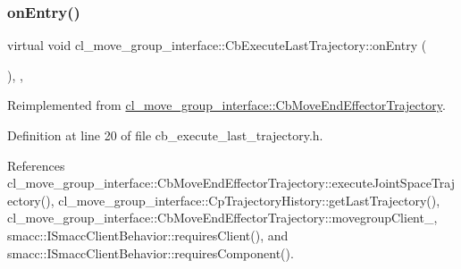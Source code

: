 \subsubsection{\texorpdfstring{on\+Entry()}{onEntry()}}
{\footnotesize\ttfamily virtual void cl\+\_\+move\+\_\+group\+\_\+interface\+::\+Cb\+Execute\+Last\+Trajectory\+::on\+Entry (\begin{DoxyParamCaption}{ }\end{DoxyParamCaption})\hspace{0.3cm}{\ttfamily [inline]}, {\ttfamily [override]}, {\ttfamily [virtual]}}



Reimplemented from \hyperlink{classcl__move__group__interface_1_1CbMoveEndEffectorTrajectory_aaedd074fd178c6390a4a3f1ccff23ad3}{cl\+\_\+move\+\_\+group\+\_\+interface\+::\+Cb\+Move\+End\+Effector\+Trajectory}.



Definition at line 20 of file cb\+\_\+execute\+\_\+last\+\_\+trajectory.\+h.



References cl\+\_\+move\+\_\+group\+\_\+interface\+::\+Cb\+Move\+End\+Effector\+Trajectory\+::execute\+Joint\+Space\+Trajectory(), cl\+\_\+move\+\_\+group\+\_\+interface\+::\+Cp\+Trajectory\+History\+::get\+Last\+Trajectory(), cl\+\_\+move\+\_\+group\+\_\+interface\+::\+Cb\+Move\+End\+Effector\+Trajectory\+::movegroup\+Client\+\_\+, smacc\+::\+I\+Smacc\+Client\+Behavior\+::requires\+Client(), and smacc\+::\+I\+Smacc\+Client\+Behavior\+::requires\+Component().


